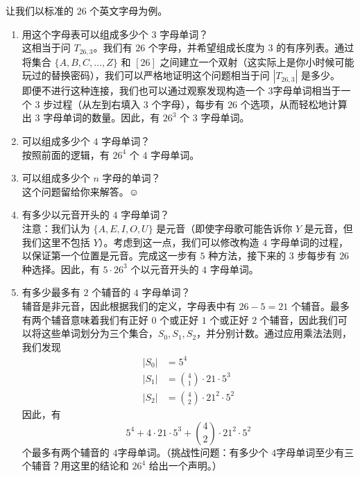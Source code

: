 \begin{example}
    让我们以标准的 $26$ 个英文字母为例。
    \begin{enumerate}
        \item 用这个字母表可以组成多少个 $3$ 字母单词？\\
              这相当于问 $T_{26,3}$。我们有 $26$ 个字母，并希望组成长度为 $3$ 的有序列表。通过将集合 $\{A, B, C, \dots , Z\}$ 和 $[26]$ 之间建立一个双射（这实际上是你小时候可能玩过的替换密码），我们可以严格地证明这个问题相当于问 $|T_{26,3}|$ 是多少。\\

              即便不进行这种连接，我们也可以通过观察发现构造一个 $3$字母单词相当于一个 $3$ 步过程（从左到右填入 $3$ 个字母），每步有 $26$ 个选项，从而轻松地计算出 $3$ 字母单词的数量。因此，有 $26^3$ 个 $3$ 字母单词。
        \item 可以组成多少个 $4$ 字母单词？\\
              按照前面的逻辑，有 $26^4$ 个 $4$ 字母单词。
        \item 可以组成多少个 $n$ 字母的单词？\\
              这个问题留给你来解答。$\smiley{}$
        \item 有多少以元音开头的 $4$ 字母单词？\\
              注意：我们认为 $\{A,E,I,O,U\}$ 是元音（即使字母歌可能告诉你 $Y$ 是元音，但我们这里不包括 $Y$）。考虑到这一点，我们可以修改构造 $4$ 字母单词的过程，以保证第一个位置是元音。完成这一步有 $5$ 种方法，接下来的 $3$ 步每步有 $26$种选择。因此，有 $5 \cdot 26^3$ 个以元音开头的 $4$ 字母单词。
        \item 有多少最多有 $2$ 个辅音的 $4$ 字母单词？\\
              辅音是非元音，因此根据我们的定义，字母表中有 $26 - 5 = 21$ 个辅音。最多有两个辅音意味着我们有正好 $0$ 个或正好 $1$ 个或正好 $2$ 个辅音，因此我们可以将这些单词划分为三个集合，$S_0, S_1, S_2$，并分别计数。通过应用乘法法则，我们发现
              \begin{align*}
                  |S_0| & = 5^4                                  \\
                  |S_1| & = { 4 \choose 1 } \cdot 21 \cdot 5^3   \\
                  |S_2| & = { 4 \choose 2 } \cdot 21^2 \cdot 5^2
              \end{align*}
              因此，有
              \[5^4 +  4 \cdot 21 \cdot 5^3 + { 4\choose2 } \cdot 21^2 \cdot 5^2\]
              个最多有两个辅音的 $4$字母单词。（挑战性问题：有多少个 $4$字母单词至少有三个辅音？用这里的结论和 $26^4$ 给出一个声明。）\\


\end{enumerate}
\end{example}
